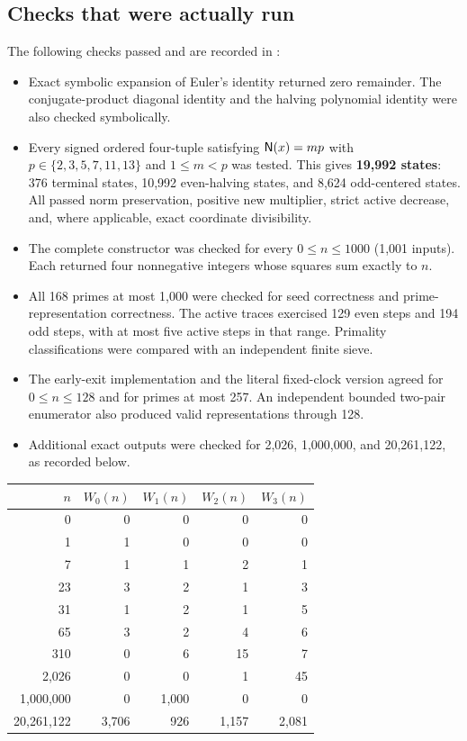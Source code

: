 \subsection{Checks that were actually run}

The following checks passed and are recorded in
:
\begin{itemize}
\item Exact symbolic expansion of Euler's identity returned zero remainder.
The conjugate-product diagonal identity and the halving polynomial identity
were also checked symbolically.
\item Every signed ordered four-tuple satisfying
$\mathsf N(x)=mp$ with $p\in\{2,3,5,7,11,13\}$ and $1\le m<p$ was tested.
This gives \textbf{19,992 states}: 376 terminal states, 10,992 even-halving
states, and 8,624 odd-centered states. All passed norm preservation,
positive new multiplier, strict active decrease, and, where applicable,
exact coordinate divisibility.
\item The complete constructor was checked for every
$0\le n\le1000$ (1,001 inputs). Each returned four nonnegative integers
whose squares sum exactly to $n$.
\item All 168 primes at most 1,000 were checked for seed correctness and
prime-representation correctness. The active traces exercised 129 even
steps and 194 odd steps, with at most five active steps in that range.
Primality classifications were compared with an independent finite sieve.
\item The early-exit implementation and the literal fixed-clock version
agreed for $0\le n\le128$ and for primes at most 257. An independent
bounded two-pair enumerator also produced valid representations through 128.
\item Additional exact outputs were checked for 2,026, 1,000,000, and
20,261,122, as recorded below.
\end{itemize}

\begin{center}
\begin{tabular}{r@{\qquad}rrrr}
\toprule
$n$&$W_0(n)$&$W_1(n)$&$W_2(n)$&$W_3(n)$\\
\midrule
0&0&0&0&0\\
1&1&0&0&0\\
7&1&1&2&1\\
23&3&2&1&3\\
31&1&2&1&5\\
65&3&2&4&6\\
310&0&6&15&7\\
2,026&0&0&1&45\\
1,000,000&0&1,000&0&0\\
20,261,122&3,706&926&1,157&2,081\\
\bottomrule
\end{tabular}
\end{center}

